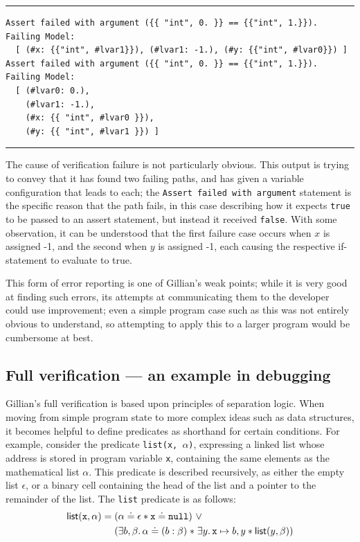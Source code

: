 \noindent\rule{\textwidth}{0.5pt}
\vspace{-0.6cm}
\begin{verbatim}
Assert failed with argument ({{ "int", 0. }} == {{"int", 1.}}).
Failing Model:
  [ (#x: {{"int", #lvar1}}), (#lvar1: -1.), (#y: {{"int", #lvar0}}) ]
Assert failed with argument ({{ "int", 0. }} == {{"int", 1.}}).
Failing Model:
  [ (#lvar0: 0.),
    (#lvar1: -1.),
    (#x: {{ "int", #lvar0 }}),
    (#y: {{ "int", #lvar1 }}) ]
\end{verbatim}
\vspace{-0.4cm}
\noindent\rule{\textwidth}{0.5pt}
\vspace{-0.6cm}
\vspace{0.5cm}

The cause of verification failure is not particularly obvious. This output is
trying to convey that it has found two failing paths, and has given a variable
configuration that leads to each; the \texttt{Assert failed with argument}
statement is the specific reason that the path fails, in this case describing
how it expects \texttt{true} to be passed to an assert statement, but instead it
received \texttt{false}. With some observation, it can be understood that the
first failure case occurs when $x$ is assigned -1, and the second when $y$ is
assigned -1, each causing the respective if-statement to evaluate to true.

This form of error reporting is one of Gillian's weak points; while it is very
good at finding such errors, its attempts at communicating them to the
developer could use improvement; even a simple program case such as this was
not entirely obvious to understand, so attempting to apply this to a larger
program would be cumbersome at best.

\subsection{Full verification --- an example in debugging}%
\label{sec:debug-example-old}

Gillian's full verification is based upon principles of separation logic. When
moving from simple program state to more complex ideas such as data structures,
it becomes helpful to define predicates as shorthand for certain conditions.
For example, consider the predicate \texttt{list(x, $\alpha$)}, expressing a
linked list whose address is stored in program variable \texttt{x}, containing
the same elements as the mathematical list $\alpha$. This predicate is described
recursively, as either the empty list $\epsilon$, or a binary cell containing
the head of the list and a pointer to the remainder of the list. The
\texttt{list} predicate is as follows:
\begin{align*}
  \mathsf{list}(\mathtt{x}, \alpha) =\; &(\alpha \doteq \epsilon \ast \mathtt{x} \doteq \mathtt{null})~\lor\\
  & (\exists b, \beta \ldotp \alpha \doteq (b : \beta) \mathrel{*} \exists y \ldotp \mathtt{x} \mapsto b, y \ast \mathsf{list}(y, \beta))
\end{align*}


